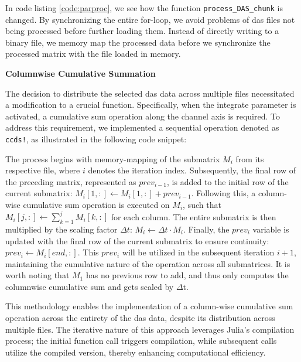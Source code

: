 

In code listing \ref{code:parproc}, we see how the function \texttt{process\_DAS\_chunk} is changed. By synchronizing the entire for-loop, we avoid problems of \acrshort{das} files not being processed before further loading them. Instead of directly writing to a binary file, we memory map the processed data before we synchronize the processed matrix with the file loaded in memory.

\textbf{Columnwise Cumulative Summation}

The decision to distribute the selected \acrshort{das} data across multiple files necessitated a modification to a crucial function. Specifically, when the integrate parameter is activated, a cumulative sum operation along the channel axis is required. To address this requirement, we implemented a sequential operation denoted as \texttt{ccds!}, as illustrated in the following code snippet:



The process begins with memory-mapping of the submatrix $M_i$ from its respective file, where $i$ denotes the iteration index. Subsequently, the final row of the preceding matrix, represented as $prev_{i-1}$, is added to the initial row of the current submatrix: $M_i[1,:] \leftarrow M_i[1,:] + prev_{i-1}$. Following this, a column-wise cumulative sum operation is executed on $M_i$, such that $M_i[j,:] \leftarrow \sum_{k=1}^j M_i[k,:]$ for each column. The entire submatrix is then multiplied by the scaling factor $\Delta t$: $M_i \leftarrow \Delta t \cdot M_i$. Finally, the $prev_i$ variable is updated with the final row of the current submatrix to ensure continuity: $prev_i \leftarrow M_i[end,:]$. This $prev_i$ will be utilized in the subsequent iteration $i+1$, maintaining the cumulative nature of the operation across all submatrices. It is worth noting that $M_1$ has no previous row to add, and thus only computes the columnwise cumulative sum and gets scaled by $\Delta$t.

This methodology enables the implementation of a column-wise cumulative sum operation across the entirety of the \acrshort{das} data, despite its distribution across multiple files. The iterative nature of this approach leverages Julia's compilation process; the initial function call triggers compilation, while subsequent calls utilize the compiled version, thereby enhancing computational efficiency.

